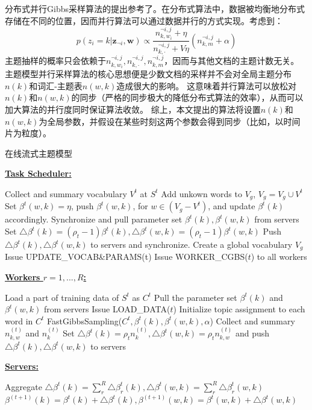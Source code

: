 分布式并行Gibbs采样算法的提出参考了\cite{smola2010an}。在分布式算法中，数据被均衡地分布式存储在不同的位置，因而并行算法可以通过数据并行的方式实现。考虑到：
\begin{equation}
p( z_i = k | \mathbf{z}_{\neg i},  \mathbf{w}) 
 \propto \dfrac{ n_{k, w_i}^{\neg i,j} + \eta }{ n_{k, \cdot}^{\neg i,j} + V\eta}
(n_{k, m}^{\neg i,j} + \alpha)
\end{equation}
主题抽样的概率只会依赖于$n_{k, w_i}^{\neg i,j}, n_{k, \cdot}^{\neg i,j}, n_{k, m}^{\neg i,j}$，因而与其他文档的主题计数无关。
主题模型并行采样算法的核心思想便是少数文档的采样并不会对全局主题分布$n(k)$和词汇-主题表$n(w, k)$造成很大的影响。
这意味着并行算法可以放松对$n(k)$和$n(w, k)$的同步（严格的同步极大的降低分布式算法的效率），从而可以加大算法的并行度同时保证算法收敛。
综上，本文提出的算法将设置$n(k)$和$n(w, k)$为全局参数，并假设在某些时刻这两个参数会得到同步（比如，以时间片为粒度）。
\begin{algorithm}[]
\caption{在线流式主题模型}
\label{alg:onlineStreamLDA}
\textbf{\underline{Task Scheduler:}}
\begin{algorithmic}[1]
\State Collect and summary vocabulary $V^t$ at $S^t$
\State Add unkown words to $V_g$, $V_g = V_g \cup V^t$
\State Set $\beta^t(w, k) = \eta$, push $\beta^t(w, k)$, for $w \in (V_g - V^t)$, and update $\beta^t(k)$ accordingly.
\State Synchronize and pull parameter set $\beta^t(k), \beta^t(w, k)$ from servers
\State Set $\bigtriangleup \beta^t(k) = (\rho_t - 1) \beta^t(k), \bigtriangleup \beta^t(w, k) = (\rho_t - 1) \beta^t(w, k)$
\State Push $\bigtriangleup \beta^t(k), \bigtriangleup \beta^t(w, k)$  to servers and synchronize.
\EndFunction
\State Create a global vocabulary $V_g$
\State Issue UPDATE\_VOCAB\&PARAMS(t)
\State Issue WORKER\_CGBS($t$) to all workers
\EndFor
\end{algorithmic}
\textbf{\underline{Workers $r = 1, ..., R$:}}
\begin{algorithmic}[1]
\State Load a part of training data of $S^t$ as $C^t$
\State Pull the parameter set $\beta^t(k)$ and $\beta^t(w, k)$ from servers
\EndFunction
{}
\State Issue LOAD\_DATA($t$)
\State Initialize topic assignment to each word in $C^t$ 
\State FastGibbsSampling($C^t, \beta^t(k), \beta^t(w, k), \alpha$)
\EndFor
\State Collect and summary $n_{k,w}^{(t)}$ and $n_{k}^{(t)}$
\State Set $\bigtriangleup \beta^t(k) = \rho_t n_{k}^{(t)}, \bigtriangleup \beta^t(w, k) = \rho_t n_{k,w}^{(t)}$ and push $\bigtriangleup \beta^t(k), \bigtriangleup \beta^t(w, k)$ to servers
\EndFunction
\end{algorithmic}  
\textbf{\underline{Servers:}}
\begin{algorithmic}[1]
\State Aggregate $\bigtriangleup \beta^t(k) = \sum_r^R{\bigtriangleup \beta^t_r(k)}, \bigtriangleup \beta^t(w, k) = \sum_r^R{\bigtriangleup \beta^t_r(w, k)}$
\State $\beta^{(t+1)}(k) =\beta^t(k) +  \bigtriangleup \beta^t(k), \beta^{(t+1)}(w, k) = \beta^t(w, k) + \bigtriangleup \beta^t(w, k)$
\EndFunction
\end{algorithmic}
\end{algorithm}  

